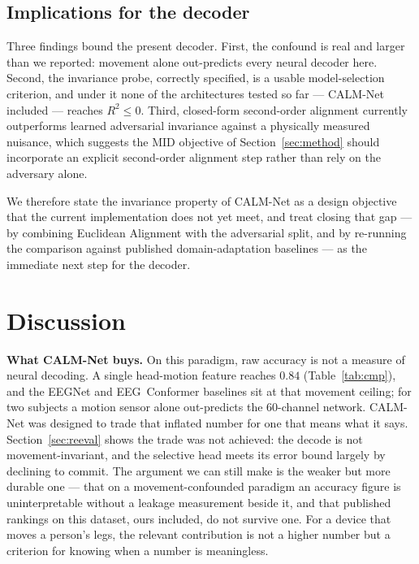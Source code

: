 \documentclass[conference]{IEEEtran}
\begin{document}
\subsection{Implications for the decoder}

Three findings bound the present decoder. First, the confound is real and larger than we
reported: movement alone out-predicts every neural decoder here. Second, the invariance
probe, correctly specified, is a usable model-selection criterion, and under it none of
the architectures tested so far --- CALM-Net included --- reaches $R^2 \le 0$. Third,
closed-form second-order alignment currently outperforms learned adversarial invariance
against a physically measured nuisance, which suggests the MID objective of
Section~\ref{sec:method} should incorporate an explicit second-order alignment step
rather than rely on the adversary alone.

We therefore state the invariance property of CALM-Net as a design objective that the
current implementation does not yet meet, and treat closing that gap --- by combining
Euclidean Alignment with the adversarial split, and by re-running the comparison against
published domain-adaptation baselines --- as the immediate next step for the decoder.

\section{Discussion}
\textbf{What CALM-Net buys.} On this paradigm, raw accuracy is not a measure of neural
decoding. A single head-motion feature reaches $0.84$ (Table~\ref{tab:cmp}), and the
EEGNet and EEG~Conformer baselines sit at that movement ceiling; for two subjects a
motion sensor alone out-predicts the $60$-channel network. CALM-Net was designed to trade that
inflated number for one that means what it says. Section~\ref{sec:reeval} shows the
trade was not achieved: the decode is not movement-invariant, and the selective head
meets its error bound largely by declining to commit. The argument we can still make is
the weaker but more durable one --- that on a movement-confounded paradigm an accuracy
figure is uninterpretable without a leakage measurement beside it, and that published
rankings on this dataset, ours included, do not survive one. For a device that moves a
person's legs, the relevant contribution is not a higher number but a criterion for
knowing when a number is meaningless.
\end{document}
